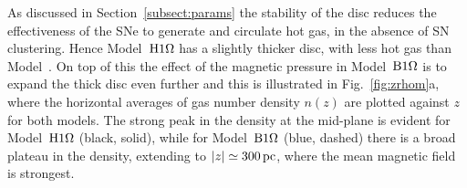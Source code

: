   As discussed in Section~\ref{subsect:params} the stability of the disc
  reduces the effectiveness of the SNe to generate and circulate hot gas, in
  the absence of SN clustering. 
  Hence Model~${\mathrm{H}1\rm{\Omega}}$ has a slightly thicker disc, with less hot gas than 
  Model~\Op.
  On top of this the effect of the magnetic pressure in Model~${\mathrm{B}1\rm{\Omega} }$ is to 
  expand the thick disc even further and this is illustrated in 
  Fig.~\ref{fig:zrhom}a, where the horizontal averages of gas number density
  $n(z)$ are plotted against $z$ for both models. 
  The strong peak in the density at the mid-plane is evident for Model~${\mathrm{H}1\rm{\Omega}}$
  (black, solid), while for Model~${\mathrm{B}1\rm{\Omega} }$ (blue, dashed) there is a broad
  plateau in the density, extending to $|z|\simeq300\,{\rm pc}$, where the mean 
  magnetic field is strongest.
  
